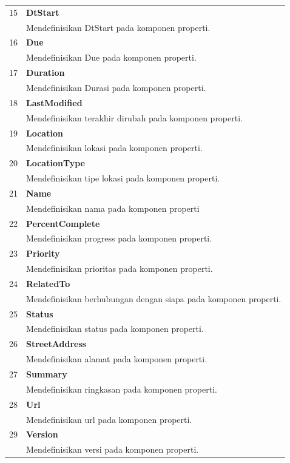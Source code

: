 \begin{longtable}{|c|p{12cm}|}
		15 & \textbf{DtStart}\\
			&	Mendefinisikan DtStart pada komponen properti.\\ \hline
		16 & \textbf{Due}\\
			&	Mendefinisikan Due pada komponen properti.\\ \hline
		17 & \textbf{Duration}\\
			&	Mendefinisikan Durasi pada komponen properti.\\ \hline
		18 & \textbf{LastModified}\\
			&	Mendefinisikan terakhir dirubah pada komponen properti.\\ \hline
		19 & \textbf{Location}\\
			&	Mendefinisikan lokasi pada komponen properti.\\ \hline
		20 & \textbf{LocationType}\\
			&	Mendefinisikan tipe lokasi pada komponen properti.\\ \hline
		21 & \textbf{Name}\\
			&	Mendefinisikan nama pada komponen properti\\ \hline
		22 & \textbf{PercentComplete}\\
			&	Mendefinisikan progress pada komponen properti.\\ \hline
		23 & \textbf{Priority}\\
			&	Mendefinisikan prioritas pada komponen properti.\\ \hline
		24 & \textbf{RelatedTo}\\
			&	Mendefinisikan berhubungan dengan siapa pada komponen properti.\\ \hline
		25 & \textbf{Status}\\
			&	Mendefinisikan status pada komponen properti.\\ \hline
		26 & \textbf{StreetAddress}\\
			&	Mendefinisikan alamat pada komponen properti.\\ \hline
		27 & \textbf{Summary}\\
			&	Mendefinisikan ringkasan pada komponen properti.\\ \hline
		28 & \textbf{Url}\\
			&	Mendefinisikan url pada komponen properti.\\ \hline
		29 & \textbf{Version}\\
			&	Mendefinisikan versi pada komponen properti.\\ \hline	
	\end{longtable}

